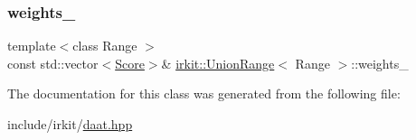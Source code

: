\mbox{\label{classirkit_1_1UnionRange_a0c53eb9b1c9e8aa18621f4c129a6ff90}} 
\subsubsection{\texorpdfstring{weights\+\_\+}{weights\_}}
{\footnotesize\ttfamily template$<$class Range $>$ \\
const std\+::vector$<$\hyperlink{classirkit_1_1UnionRange_a47fb098a85581f5e33f4203e16245dae}{Score}$>$\& \hyperlink{classirkit_1_1UnionRange}{irkit\+::\+Union\+Range}$<$ Range $>$\+::weights\+\_\+\hspace{0.3cm}{\ttfamily [protected]}}



The documentation for this class was generated from the following file\+:\begin{DoxyCompactItemize}
\item 
include/irkit/\hyperlink{daat_8hpp}{daat.\+hpp}\end{DoxyCompactItemize}
